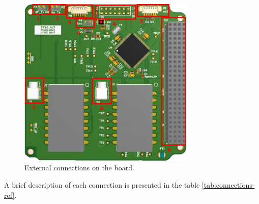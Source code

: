 \documentclass[12pt]{book}
\begin{document}
\begin{figure}[!h]
	\begin{center}
		\includegraphics[width=0.75\textwidth]{figures/ttc_board_pins}
		\caption{External connections on the board.}
		\label{fig:connections-ref}
	\end{center}
\end{figure}

A brief description of each connection is presented in the table \ref{tab:connections-ref}.
\end{document}
